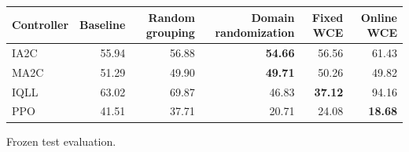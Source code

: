 \begin{tabular}{lrrrrr}
\hline
Controller & Baseline & Random grouping & Domain randomization & Fixed WCE & Online WCE \\
\hline
IA2C & 55.94 & 56.88 & \textbf{54.66} & 56.56 & 61.43 \\
MA2C & 51.29 & 49.90 & \textbf{49.71} & 50.26 & 49.82 \\
IQLL & 63.02 & 69.87 & 46.83 & \textbf{37.12} & 94.16 \\
PPO & 41.51 & 37.71 & 20.71 & 24.08 & \textbf{18.68} \\
\hline
\end{tabular}
Frozen test evaluation.
